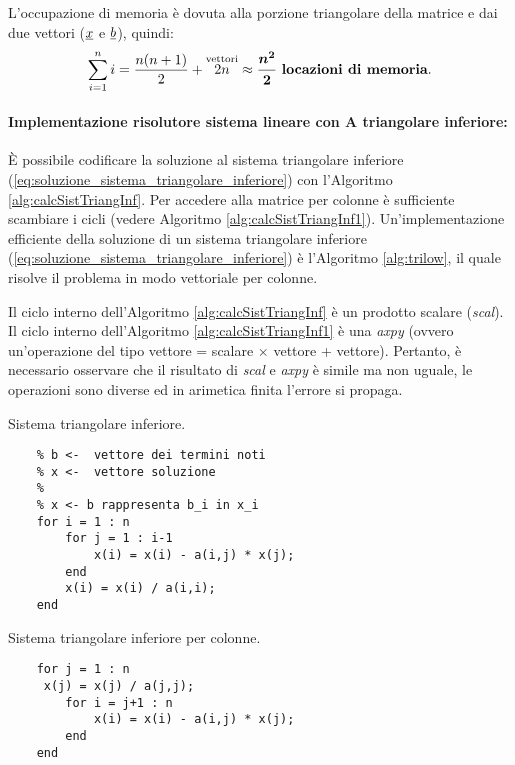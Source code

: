L'occupazione di memoria è dovuta alla porzione triangolare della matrice e dai due vettori ($\uline x$ e $\uline b$), quindi:
\begin{equation*}
    \sum_{i=1}^n i = \frac{n(n+1)}{2}+ \overset{\text{vettori}}{2n}\approx \boldsymbol{\frac{n^2}{2}}\text{ \textbf{locazioni di memoria}.}
\end{equation*}

\paragraph{Implementazione risolutore sistema lineare con A triangolare inferiore:} È possibile codificare la soluzione al sistema triangolare inferiore (\ref{eq:soluzione_sistema_triangolare_inferiore}) con l'Algoritmo \ref{alg:calcSistTriangInf}. Per accedere alla matrice per colonne è sufficiente scambiare i cicli (vedere Algoritmo \ref{alg:calcSistTriangInf1}). Un'implementazione efficiente della soluzione di un sistema triangolare inferiore (\ref{eq:soluzione_sistema_triangolare_inferiore}) è l'Algoritmo \ref{alg:trilow}, il quale risolve il problema in modo vettoriale per colonne.

Il ciclo interno dell'Algoritmo \ref{alg:calcSistTriangInf} è un prodotto scalare (\textit{scal}). Il ciclo interno dell'Algoritmo \ref{alg:calcSistTriangInf1} è una \textit{axpy} (ovvero un'operazione del tipo vettore = scalare $\times$ vettore + vettore). Pertanto, è necessario osservare che il risultato di \textit{scal} e \textit{axpy} è simile ma non uguale, le operazioni sono diverse ed in arimetica finita l'errore si propaga.

\begin{algorithm}\caption{Sistema triangolare inferiore.}
\label{alg:calcSistTriangInf}
    \begin{lstlisting}[style=Matlab-editor]
    % a <-  matrice dei coefficienti
    % b <-  vettore dei termini noti
    % x <-  vettore soluzione
    %
    % x <- b rappresenta b_i in x_i
    for i = 1 : n
        for j = 1 : i-1
            x(i) = x(i) - a(i,j) * x(j);
        end
        x(i) = x(i) / a(i,i);
    end
    \end{lstlisting}
\end{algorithm}

\begin{algorithm}\caption{Sistema triangolare inferiore per colonne.}
\label{alg:calcSistTriangInf1}
    \begin{lstlisting}[style=Matlab-editor]
    % x <- b
    for j = 1 : n
     x(j) = x(j) / a(j,j);
        for i = j+1 : n
            x(i) = x(i) - a(i,j) * x(j);
        end
    end
    \end{lstlisting}
\end{algorithm}

